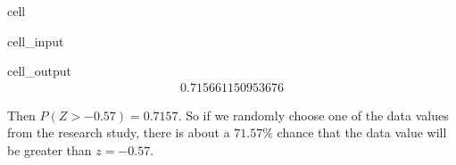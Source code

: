 \documentclass[letterpaper,10pt,english]{jupyterBook}
\begin{document}
\begin{sphinxuseclass}{cell}\begin{sphinxVerbatimInput}

\begin{sphinxuseclass}{cell_input}
\begin{sphinxVerbatim}[commandchars=\\\{\}]
\end{sphinxVerbatim}

\end{sphinxuseclass}\end{sphinxVerbatimInput}
\begin{sphinxVerbatimOutput}

\begin{sphinxuseclass}{cell_output}\begin{equation*}
\begin{split}0.715661150953676\end{split}
\end{equation*}
\end{sphinxuseclass}\end{sphinxVerbatimOutput}

\end{sphinxuseclass}
\sphinxAtStartPar
Then \(P(Z > -0.57) = 0.7157\). So if we randomly choose one of the data values from the research study, there is about a \(71.57\%\) chance that the data value will be greater than \(z = -0.57\).
\end{document}
